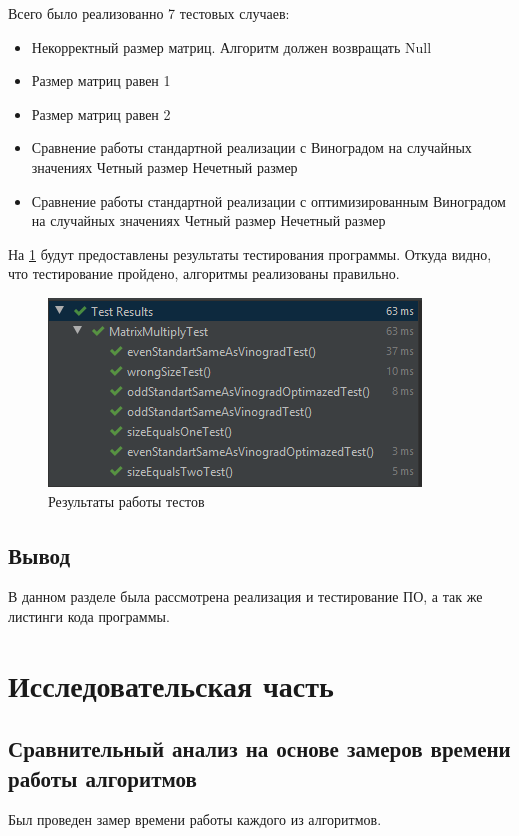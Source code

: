 \documentclass[12pt]{report}
\begin{document}
Всего было реализованно 7 тестовых случаев:
\begin{itemize}
	\item Некорректный размер матриц. Алгоритм должен возвращать Null
	\item Размер матриц равен 1
	\item Размер матриц равен 2
	\item Сравнение работы стандартной реализации с Виноградом на случайных значениях
	\subitem Четный размер
	\subitem Нечетный размер
	\item Сравнение работы стандартной реализации с оптимизированным Виноградом на случайных значениях
	\subitem Четный размер
	\subitem Нечетный размер
\end{itemize}

На \ref{fig:test} будут предоставлены результаты тестирования программы. Откуда видно, что тестирование пройдено, алгоритмы реализованы правильно.
\begin{figure}[!htbp]
\centering
\includegraphics[scale=1.2]{TestsPassed}
\caption{Результаты работы тестов}
\label{fig:test}
\end{figure} 

\newpage
\section{Вывод}
В данном разделе была рассмотрена реализация и тестирование ПО, а так же листинги кода программы.


\chapter{Исследовательская часть}

\section{Сравнительный анализ на основе замеров времени работы алгоритмов}

Был проведен замер времени работы каждого из алгоритмов.
\end{document}
